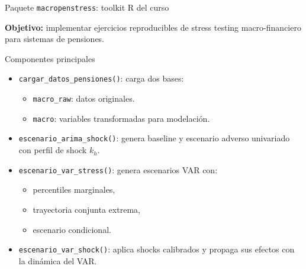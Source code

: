 \documentclass[10pt,aspectratio=169]{beamer}
\begin{document}
\begin{frame}{Paquete \texttt{macropenstress}: toolkit R del curso}

\textbf{Objetivo:} implementar ejercicios reproducibles de stress testing macro-financiero para sistemas de pensiones.

\vspace{0.3cm}

\begin{block}{Componentes principales}
\begin{itemize}
  \item \texttt{cargar\_datos\_pensiones()}: carga dos bases:
  \begin{itemize}
    \item \texttt{macro\_raw}: datos originales.
    \item \texttt{macro}: variables transformadas para modelación.
  \end{itemize}

  \item \texttt{escenario\_arima\_shock()}: genera baseline y escenario adverso univariado con perfil de shock $k_h$.

  \item \texttt{escenario\_var\_stress()}: genera escenarios VAR con:
  \begin{itemize}
    \item percentiles marginales,
    \item trayectoria conjunta extrema,
    \item escenario condicional.
  \end{itemize}

  \item \texttt{escenario\_var\_shock()}: aplica shocks calibrados y propaga sus efectos con la dinámica del VAR.
\end{itemize}
\end{block}

\end{frame}
\end{document}
